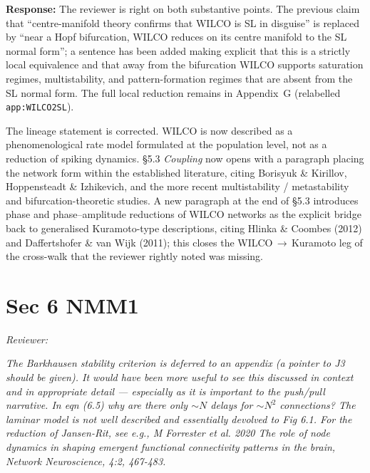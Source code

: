 \documentclass[12pt,a4paper]{article}
\newcommand{\reviewercomment}[1]{\par\smallskip\noindent\textit{Reviewer:}\par\smallskip\begingroup\itshape #1\par\endgroup\smallskip}
\newcommand{\ourresponse}[1]{\par\noindent\textbf{Response:} #1\par\medskip}
\begin{document}
\ourresponse{The reviewer is right on both substantive points. The previous claim that ``centre-manifold theory confirms that WILCO is SL in disguise'' is replaced by ``near a Hopf bifurcation, WILCO reduces on its centre manifold to the SL normal form''; a sentence has been added making explicit that this is a strictly local equivalence and that away from the bifurcation WILCO supports saturation regimes, multistability, and pattern-formation regimes that are absent from the SL normal form. The full local reduction remains in Appendix~G (relabelled \Verb|app:WILCO2SL|).

The lineage statement is corrected. WILCO is now described as a phenomenological rate model formulated at the population level, not as a reduction of spiking dynamics. §5.3 \emph{Coupling} now opens with a paragraph placing the network form within the established literature, citing Borisyuk \& Kirillov, Hoppensteadt \& Izhikevich, and the more recent multistability / metastability and bifurcation-theoretic studies. A new paragraph at the end of §5.3 introduces phase and phase--amplitude reductions of WILCO networks as the explicit bridge back to generalised Kuramoto-type descriptions, citing Hlinka \& Coombes (2012) and Daffertshofer \& van Wijk (2011); this closes the WILCO\,$\to$\,Kuramoto leg of the cross-walk that the reviewer rightly noted was missing.}

\section*{Sec 6 NMM1}

\reviewercomment{The Barkhausen stability criterion is deferred to an appendix (a pointer to J3 should be given). It would have been more useful to see this discussed in context and in appropriate detail --- especially as it is important to the push/pull narrative. In eqn (6.5) why are there only $\sim\!N$ delays for $\sim\!N^{2}$ connections? The laminar model is not well described and essentially devolved to Fig 6.1. For the reduction of Jansen-Rit, see e.g., M Forrester et al. 2020 The role of node dynamics in shaping emergent functional connectivity patterns in the brain, Network Neuroscience, 4:2, 467-483.}
\end{document}
